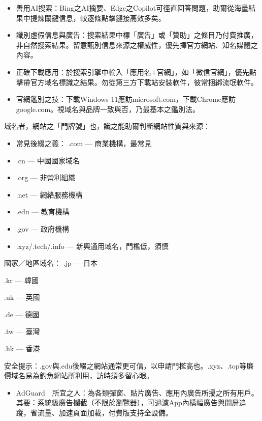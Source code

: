 
\begin{itemize}
  \item 善用AI搜索：Bing之AI摘要、Edge之Copilot可徑直回答問題，助爾從海量結果中提煉關鍵信息，較逐條點擊鏈接高效多矣。
  \item 識別虛假信息與廣告：搜索結果中標「廣告」或「贊助」之條目乃付費推廣，非自然搜索結果。留意甄別信息來源之權威性，優先擇官方網站、知名媒體之內容。
  \item 正確下載應用：於搜索引擎中輸入「應用名+官網」，如「微信官網」，優先點擊帶官方域名標識之結果。勿從第三方下載站安裝軟件，彼常捆綁流氓軟件。
  \item 官網鑑別之技：下載Windows 11應訪microsoft.com，下載Chrome應訪google.com。視域名與品牌一致與否，乃最基本之鑑別法。
\end{itemize}


域名者，網站之「門牌號」也，識之能助爾判斷網站性質與來源：

\begin{itemize}
  \item 常見後綴之義： .com — 商業機構，最常見
  \item .cn — 中國國家域名
  \item .org — 非營利組織
  \item .net — 網絡服務機構
  \item .edu — 教育機構
  \item .gov — 政府機構
  \item .xyz/.tech/.info — 新興通用域名，門檻低，須慎
\end{itemize}

國家／地區域名： .jp — 日本

.kr — 韓國

.uk — 英國

.de — 德國

.tw — 臺灣

.hk — 香港

安全提示：.gov與.edu後綴之網站通常更可信，以申請門檻高也。.xyz、.top等廉價域名易為釣魚網站所利用，訪時須多留心眼。


\begin{itemize}
  \item AdGuard　所宜之人：為各類彈窗、貼片廣告、應用內廣告所擾之所有用戶。其要：系統級廣告攔截（不限於瀏覽器），可過濾App內橫幅廣告與開屏追蹤，省流量、加速頁面加載，付費版支持全設備。
\end{itemize}

